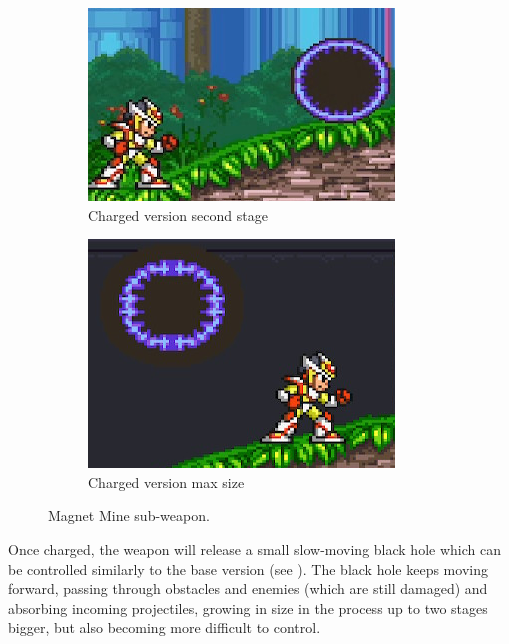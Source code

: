 \begin{figure}[htp]
	\ContinuedFloat
	\centering
	\begin{subfigure}[t]{0.4\linewidth}
		\centering
		\includegraphics[width=\linewidth]{figures/X2/weapons/M_mine_5.png}	
		\caption{Charged version second stage}
	\end{subfigure}
	\begin{subfigure}[t]{0.35\linewidth}
		\centering
		\includegraphics[width=\linewidth]{figures/X2/weapons/M_mine_6.png}	
		\caption{Charged version max size}
	\end{subfigure}
	\caption{Magnet Mine sub-weapon.}
\end{figure}
Once charged, the weapon will release a small slow-moving black hole which can be controlled similarly to the base version (see ). The black hole keeps moving forward, passing through obstacles and enemies (which are still damaged) and absorbing incoming projectiles, growing in size in the process up to two stages bigger, but also becoming more difficult to control.



